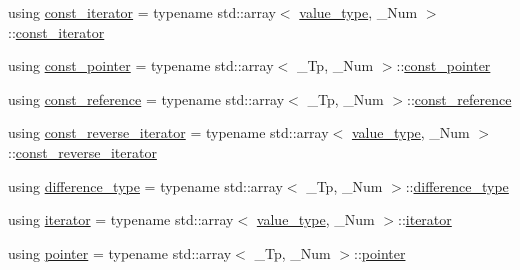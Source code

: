 \begin{DoxyCompactItemize}
\item 
using \hyperlink{class____gnu__cxx_1_1__StaticPolynomial_a6fac29559236e7576f7e35b03d35ee08}{const\+\_\+iterator} = typename std\+::array$<$ \hyperlink{class____gnu__cxx_1_1__StaticPolynomial_af23110f5a002cd6caa3542df7cf35284}{value\+\_\+type}, \+\_\+\+Num $>$\+::\hyperlink{class____gnu__cxx_1_1__StaticPolynomial_a6fac29559236e7576f7e35b03d35ee08}{const\+\_\+iterator}
\item 
using \hyperlink{class____gnu__cxx_1_1__StaticPolynomial_a906c0452a31199908a09949f1f90af9e}{const\+\_\+pointer} = typename std\+::array$<$ \+\_\+\+Tp, \+\_\+\+Num $>$\+::\hyperlink{class____gnu__cxx_1_1__StaticPolynomial_a906c0452a31199908a09949f1f90af9e}{const\+\_\+pointer}
\item 
using \hyperlink{class____gnu__cxx_1_1__StaticPolynomial_a4cefddf230fb5882fa34d8c5f63c60bc}{const\+\_\+reference} = typename std\+::array$<$ \+\_\+\+Tp, \+\_\+\+Num $>$\+::\hyperlink{class____gnu__cxx_1_1__StaticPolynomial_a4cefddf230fb5882fa34d8c5f63c60bc}{const\+\_\+reference}
\item 
using \hyperlink{class____gnu__cxx_1_1__StaticPolynomial_a03b96649dc974fc6829342659325b7cb}{const\+\_\+reverse\+\_\+iterator} = typename std\+::array$<$ \hyperlink{class____gnu__cxx_1_1__StaticPolynomial_af23110f5a002cd6caa3542df7cf35284}{value\+\_\+type}, \+\_\+\+Num $>$\+::\hyperlink{class____gnu__cxx_1_1__StaticPolynomial_a03b96649dc974fc6829342659325b7cb}{const\+\_\+reverse\+\_\+iterator}
\item 
using \hyperlink{class____gnu__cxx_1_1__StaticPolynomial_a4bce7e45f80b4b78465834f02236c5cc}{difference\+\_\+type} = typename std\+::array$<$ \+\_\+\+Tp, \+\_\+\+Num $>$\+::\hyperlink{class____gnu__cxx_1_1__StaticPolynomial_a4bce7e45f80b4b78465834f02236c5cc}{difference\+\_\+type}
\item 
using \hyperlink{class____gnu__cxx_1_1__StaticPolynomial_ac52661d1503c79a7c5c90426cd0ac41e}{iterator} = typename std\+::array$<$ \hyperlink{class____gnu__cxx_1_1__StaticPolynomial_af23110f5a002cd6caa3542df7cf35284}{value\+\_\+type}, \+\_\+\+Num $>$\+::\hyperlink{class____gnu__cxx_1_1__StaticPolynomial_ac52661d1503c79a7c5c90426cd0ac41e}{iterator}
\item 
using \hyperlink{class____gnu__cxx_1_1__StaticPolynomial_ae3f08c03fb0b4172765f8e406c16029d}{pointer} = typename std\+::array$<$ \+\_\+\+Tp, \+\_\+\+Num $>$\+::\hyperlink{class____gnu__cxx_1_1__StaticPolynomial_ae3f08c03fb0b4172765f8e406c16029d}{pointer}

\end{DoxyCompactItemize}
